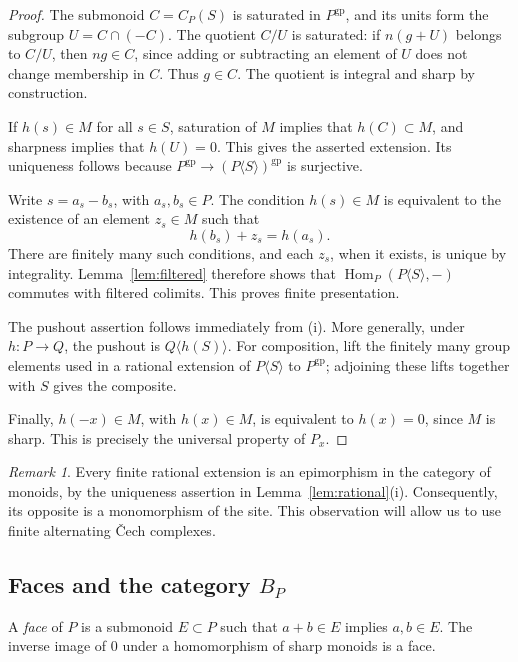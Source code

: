 \documentclass[11pt]{article}
\theoremstyle{definition}
\theoremstyle{remark}
\newtheorem{remark}[theorem]{Remark}
\DeclareMathOperator{\Hom}{Hom}
\newcommand{\gp}{\mathrm{gp}}
\begin{document}
\begin{proof}
The submonoid \(C=C_P(S)\) is saturated in \(P^{\gp}\), and its units
form the subgroup \(U=C\cap(-C)\). The quotient \(C/U\) is saturated:
if \(n(g+U)\) belongs to \(C/U\), then \(ng\in C\), since adding or
subtracting an element of \(U\) does not change membership in \(C\).
Thus \(g\in C\). The quotient is integral and sharp by construction.

If \(h(s)\in M\) for all \(s\in S\), saturation of \(M\) implies that
\(h(C)\subset M\), and sharpness implies that \(h(U)=0\). This gives
the asserted extension. Its uniqueness follows because
\(P^{\gp}\to(P\langle S\rangle)^{\gp}\) is surjective.

Write \(s=a_s-b_s\), with \(a_s,b_s\in P\). The condition
\(h(s)\in M\) is equivalent to the existence of an element \(z_s\in M\)
such that
\[
h(b_s)+z_s=h(a_s).
\]
There are finitely many such conditions, and each \(z_s\), when it
exists, is unique by integrality. Lemma~\ref{lem:filtered} therefore
shows that
\(\Hom_P(P\langle S\rangle,-)\) commutes with filtered colimits.
This proves finite presentation.

The pushout assertion follows immediately from (i). More generally,
under \(h:P\to Q\), the pushout is
\(Q\langle h(S)\rangle\). For composition, lift the finitely many
group elements used in a rational extension of \(P\langle S\rangle\)
to \(P^{\gp}\); adjoining these lifts together with \(S\) gives the
composite.

Finally, \(h(-x)\in M\), with \(h(x)\in M\), is equivalent to
\(h(x)=0\), since \(M\) is sharp. This is precisely the universal
property of \(P_x\).
\end{proof}

\begin{remark}\label{rem:monomorphisms}
Every finite rational extension is an epimorphism in the category
of monoids, by the uniqueness assertion in
Lemma~\ref{lem:rational}(i). Consequently, its opposite is a
monomorphism of the site. This observation will allow us to use
finite alternating \v{C}ech complexes.
\end{remark}

\subsection{Faces and the category \(B_P\)}

A \emph{face} of \(P\) is a submonoid \(E\subset P\) such that
\(a+b\in E\) implies \(a,b\in E\). The inverse image of \(0\) under a
homomorphism of sharp monoids is a face.
\end{document}
